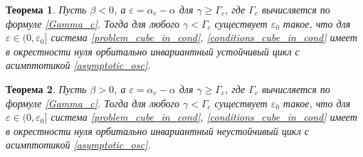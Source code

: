 \documentclass[fullscreen=true, unicode, bookmarks=false]{beamer}
\newtheorem{rustheorem}{Теорема }
\begin{document}
\begin{frame}

\begin{rustheorem}
Пусть $\beta<0$, а $ \varepsilon = \alpha_c - \alpha $ для $\gamma \geqslant \Gamma_c$, где $\Gamma_c$ вычисляется по формуле \eqref{Gamma_c}. Тогда для любого $\gamma < \Gamma_c$ существует $ \varepsilon_0 $ такое, что для $ \varepsilon \in (0, \varepsilon_0] $ система \eqref{problem_cube_in_cond}, \eqref{conditions_cube_in_cond} имеет в окрестности нуля орбитально инвариантный устойчивый цикл с асимптотикой \eqref{asymptotic_osc}.
\end{rustheorem}
\begin{rustheorem}
Пусть $\beta>0$, а $ \varepsilon = \alpha_c - \alpha $ для $\gamma \geqslant \Gamma_c$, где $\Gamma_c$ вычисляется по формуле \eqref{Gamma_c}. Тогда для любого $\gamma < \Gamma_c$ существует $ \varepsilon_0 $ такое, что для $ \varepsilon \in (0, \varepsilon_0] $ система \eqref{problem_cube_in_cond}, \eqref{conditions_cube_in_cond} имеет в окрестности нуля орбитально инвариантный неустойчивый цикл с асимптотикой \eqref{asymptotic_osc}.
\end{rustheorem}

\end{frame}
\end{document}
